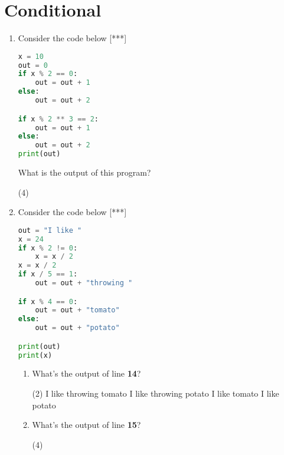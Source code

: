 \documentclass[11pt]{amsart}
\begin{document}
\section{Conditional}
\begin{enumerate}
\item Consider the code below [***]
\begin{lstlisting}[language=Python]
x = 10
out = 0
if x % 2 == 0:
	out = out + 1
else:
	out = out + 2

if x % 2 ** 3 == 2:
	out = out + 1
else:
	out = out + 2
print(out)
\end{lstlisting}
What is the output of this program?
	\begin{tasks}(4)
	\end{tasks}
\item Consider the code below [***]
\begin{lstlisting}[language=Python]
out = "I like "
x = 24
if x % 2 != 0:
	x = x / 2
x = x / 2
if x / 5 == 1:
	out = out + "throwing "

if x % 4 == 0:
	out = out + "tomato"
else:
	out = out + "potato"

print(out)
print(x)
\end{lstlisting}
	\begin{enumerate}
	\item What's the output of line \textbf{14}?
		\begin{tasks}(2)
			\task I like throwing tomato
			\task I like throwing potato
			\task I like tomato
			\task I like potato
		\end{tasks}
	
	\item What's the output of line \textbf{15}?
			\begin{tasks}(4)
			\task 24
			\task 12
			\task 6
			\task 6.0
		\end{tasks}
	\end{enumerate}
\end{enumerate}
\end{document}
